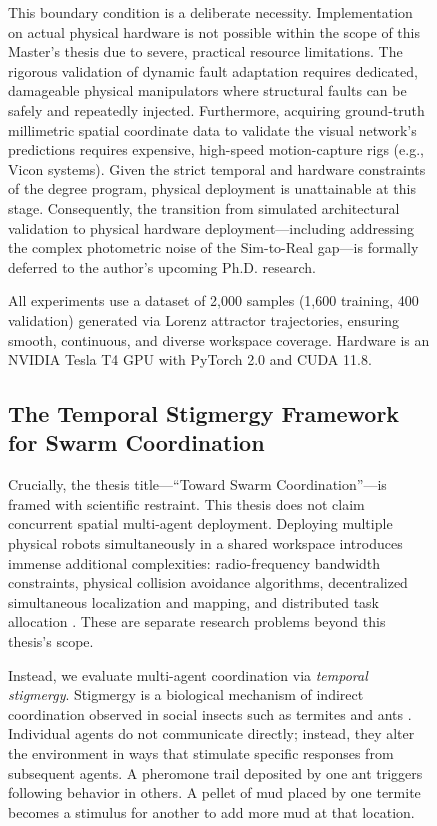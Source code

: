 \documentclass[12pt,a4paper,oneside]{report}
\begin{document}
\begin{figure}[H]
This boundary condition is a deliberate necessity. Implementation on actual physical hardware is not possible within the scope of this Master's thesis due to severe, practical resource limitations. The rigorous validation of dynamic fault adaptation requires dedicated, damageable physical manipulators where structural faults can be safely and repeatedly injected. Furthermore, acquiring ground-truth millimetric spatial coordinate data to validate the visual network's predictions requires expensive, high-speed motion-capture rigs (e.g., Vicon systems). Given the strict temporal and hardware constraints of the degree program, physical deployment is unattainable at this stage. Consequently, the transition from simulated architectural validation to physical hardware deployment---including addressing the complex photometric noise of the Sim-to-Real gap---is formally deferred to the author's upcoming Ph.D. research.

All experiments use a dataset of 2,000 samples (1,600 training, 400 validation) generated via Lorenz attractor trajectories, ensuring smooth, continuous, and diverse workspace coverage. Hardware is an NVIDIA Tesla T4 GPU with PyTorch 2.0 and CUDA 11.8.

\subsection{The Temporal Stigmergy Framework for Swarm Coordination}
\label{subsec:temporal_stigmergy_framework_intro}

Crucially, the thesis title---``Toward Swarm Coordination''---is framed with scientific restraint. This thesis does not claim concurrent spatial multi-agent deployment. Deploying multiple physical robots simultaneously in a shared workspace introduces immense additional complexities: radio-frequency bandwidth constraints, physical collision avoidance algorithms, decentralized simultaneous localization and mapping, and distributed task allocation \cite{matsuki2024gaussian, keetha2024splattam}. These are separate research problems beyond this thesis's scope.

Instead, we evaluate multi-agent coordination via \textit{temporal stigmergy}. Stigmergy is a biological mechanism of indirect coordination observed in social insects such as termites and ants \cite{bongard2006resilient}. Individual agents do not communicate directly; instead, they alter the environment in ways that stimulate specific responses from subsequent agents. A pheromone trail deposited by one ant triggers following behavior in others. A pellet of mud placed by one termite becomes a stimulus for another to add more mud at that location.


\end{figure}
\end{document}
